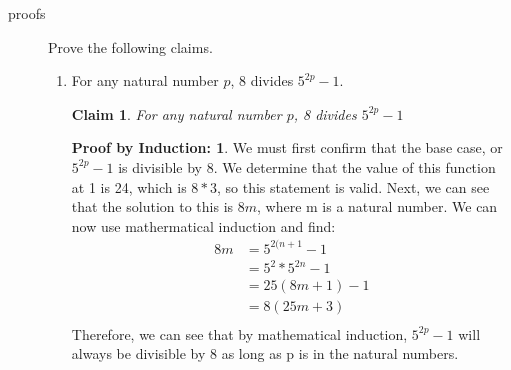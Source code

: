 \documentclass[11pt]{letter}
\newtheorem{claim}{Claim}
\theoremstyle{definition}
\newtheorem{PBI}{Proof by Induction:}
\begin{document}
\begin{description}
\begin{enumerate}
		\end{enumerate}
	\item[proofs] Prove the following claims. 
		\begin{enumerate}
			\item For any natural number $p$, 8 divides $5^{2p}-1$.
\begin{claim}
For any natural number $p$, 8 divides $5^{2p}-1$
\end{claim}
\begin{PBI}
We must first confirm that the base case, or $5^{2p}-1$ is divisible by 8. We determine that the value of this function at 1 is 24, which is $8*3$, so this statement is valid. Next, we can see that the solution to this is $8m$, where m is a natural number. We can now use mathermatical induction and find: \\
\begin{align*}
8m &= 5^{2(n+1}-1 \tag{Solving for n+1, since we know that this is true when n is true when n=1} \\
&= 5^2*5^{2n}-1 \\
&=25(8m+1)-1 \\
&=8(25m+3) \\
\end{align*}
Therefore, we can see that by mathematical induction, $5^{2p}-1$ will always be divisible by 8 as long as p is in the natural numbers.
 
\end{PBI}


\end{enumerate}
\end{description}
\end{document}
